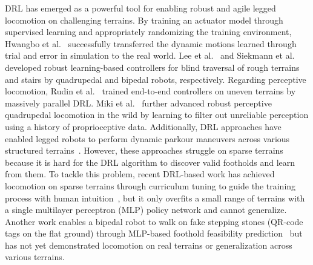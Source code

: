 \documentclass[9pt,twocolumn,twoside]{osajnl}
\begin{document}
DRL has emerged as a powerful tool for enabling robust and agile legged locomotion on challenging terrains. By training an actuator model through supervised learning and appropriately randomizing the training environment, Hwangbo et al.~\cite{Hwangbo2019} successfully transferred the dynamic motions learned through trial and error in simulation to the real world.
Lee et al.~\cite{Lee2020} and Siekmann et al.~\cite{cassie_stairs} developed robust learning-based controllers for blind traversal of rough terrains and stairs by quadrupedal and bipedal robots, respectively. 
Regarding perceptive locomotion, Rudin et al.~\cite{Rudin2021} trained end-to-end controllers on uneven terrains by massively parallel DRL. Miki et al.~\cite{Miki2022} further advanced robust perceptive quadrupedal locomotion in the wild by learning to filter out unreliable perception using a history of proprioceptive data. Additionally, DRL approaches have enabled legged robots to perform dynamic parkour maneuvers across various structured terrains~\cite{Rudin2022, anymal_parkour, zhuang2023robot, cheng2023parkour, zhuang2024humanoid, zhang2024wococo}. 
However, these approaches struggle on sparse terrains because it is hard for the DRL algorithm to discover valid footholds and learn from them. To tackle this problem, recent DRL-based work has achieved locomotion on sparse terrains through curriculum tuning to guide the training process with human intuition~\cite{chong_iros}, but it only overfits a small range of terrains with a single multilayer perceptron (MLP) policy network and cannot generalize. Another work enables a bipedal robot to walk on fake stepping stones (QR-code tags on the flat ground) through MLP-based foothold feasibility prediction~\cite{Duan2022LearningDB} but has not yet demonstrated locomotion on real terrains or generalization across various terrains.
\end{document}
